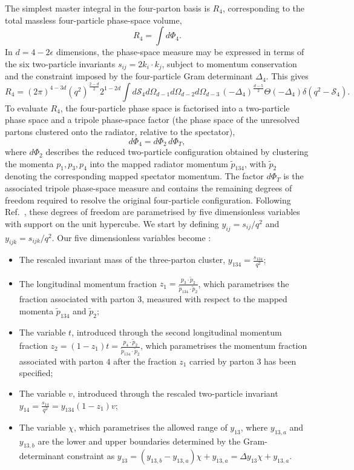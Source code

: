 The simplest master integral in the four-parton basis is $R_4$, corresponding to the total
massless four-particle phase-space volume,
\begin{equation*}
    R_4=\int d\Phi_4.
\end{equation*}
In $d=4-2\epsilon$ dimensions, the phase-space measure may be expressed in terms of the six
two-particle invariants $s_{ij}=2k_i\cdot k_j$, subject to momentum conservation and the
constraint imposed by the four-particle Gram determinant $\Delta_4$. This gives
\begin{equation}
    R_4 = (2\pi)^{4-3d}\!\left(q^2\right)^{\frac{2-d}{2}}2^{1-2d}\int d\mathcal S_4d\Omega_{d-1}d\Omega_{d-2}d\Omega_{d-3}\,(-\Delta_4)^{\frac{d-5}{2}}\Theta(-\Delta_4)\delta\!\left(q^2-\mathcal S_4\right).
\end{equation}
To evaluate $R_4$, the four-particle phase space is factorised into a two-particle phase space
and a tripole phase-space factor (the phase space of the unresolved partons clustered onto the radiator, relative to the spectator),
\begin{equation*}
    d\Phi_4=d\Phi_2\,d\Phi_T,
\end{equation*}
where $d\Phi_2$ describes the reduced two-particle configuration obtained by clustering the
momenta $p_1,p_3,p_4$ into the mapped radiator momentum $\tilde p_{134}$, with $\tilde p_2$
denoting the corresponding mapped spectator momentum. The factor $d\Phi_T$ is the associated
tripole phase-space measure and contains the remaining degrees of freedom required to resolve
the original four-particle configuration. Following Ref.~\cite{GehrmannDeRidder0311276}, these
degrees of freedom are parametrised by five dimensionless variables with support on the unit
hypercube. We start by defining $y_{ij} = s_{ij}/q^2$ and $y_{ijk} = s_{ijk}/q^2$. Our five
dimensionless variables become \cite{GehrmannDeRidder0311276}:
\begin{itemize}
    \item The rescaled invariant mass of the three-parton cluster, $y_{134} = \frac{s_{134}}{q^2}$;
    \item The longitudinal momentum fraction $z_1 = \frac{p_3\cdot\tilde p_2}{\tilde p_{134}\cdot\tilde p_2}$, which parametrises the fraction associated with parton $3$, measured with respect to the mapped momenta $\tilde p_{134}$ and $\tilde p_2$;
    \item The variable $t$, introduced through the second longitudinal momentum fraction $z_2 = (1-z_1)t = \frac{p_4\cdot\tilde p_2}{\tilde p_{134}\cdot\tilde p_2}$, which parametrises the momentum fraction associated with parton $4$ after the fraction $z_1$ carried by parton $3$ has been specified;
    \item The variable $v$, introduced through the rescaled two-particle invariant $y_{14}=\frac{s_{14}}{q^2} = y_{134}(1-z_1)v$;
    \item The variable $\chi$, which parametrises the allowed range of $y_{13}$, where $y_{13,a}$ and $y_{13,b}$ are the lower and upper boundaries determined by the Gram-determinant constraint as $y_{13} = (y_{13,b}-y_{13,a})\chi+y_{13,a}= \Delta y_{13}\chi+y_{13,a}$.
\end{itemize}
